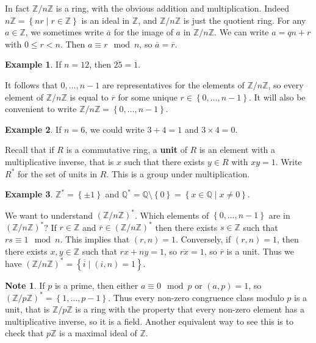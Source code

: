 \documentclass{article}
\newcommand{\Z}{\mathbb{Z}}
\newcommand{\Q}{\mathbb{Q}}
\newcommand{\rb}[1]{\left( #1 \right)}
\newcommand{\cb}[1]{\left\{ #1 \right\}}
\theoremstyle{definition}\newtheorem{definition}{Definition}
\theoremstyle{definition}\newtheorem*{remark}{Remark}
\theoremstyle{definition}\newtheorem*{example}{Example}
\theoremstyle{definition}\newtheorem*{note}{Note}
\begin{document}
In fact $ \Z / n\Z $ is a ring, with the obvious addition and multiplication. Indeed $ n\Z = \cb{nr \mid r \in \Z} $ is an ideal in $ \Z $, and $ \Z / n\Z $ is just the quotient ring. For any $ a \in \Z $, we sometimes write $ \overline{a} $ for the image of $ a $ in $ \Z / n\Z $. We can write $ a = qn + r $ with $ 0 \le r < n $. Then $ a \equiv r \mod n $, so $ \overline{a} = \overline{r} $.

\begin{example}
If $ n = 12 $, then $ \overline{25} = \overline{1} $.
\end{example}

It follows that $ 0, \dots, n - 1 $ are representatives for the elements of $ \Z / n\Z $, so every element of $ \Z / n\Z $ is equal to $ \overline{r} $ for some unique $ r \in \cb{0, \dots, n - 1} $. It will also be convenient to write $ \Z / n\Z = \cb{0, \dots, n - 1} $.

\begin{example}
If $ n = 6 $, we could write $ 3 + 4 = 1 $ and $ 3 \times 4 = 0 $.
\end{example}

Recall that if $ R $ is a commutative ring, a \textbf{unit} of $ R $ is an element with a multiplicative inverse, that is $ x $ such that there exists $ y \in R $ with $ xy = 1 $. Write $ R^* $ for the set of units in $ R $. This is a group under multiplication.

\begin{example}
$ \Z^* = \cb{\pm 1} $ and $ \Q^* = \Q \setminus \cb{0} = \cb{x \in \Q \mid x \ne 0} $.
\end{example}

We want to understand $ \rb{\Z / n\Z}^* $. Which elements of $ \cb{0, \dots, n - 1} $ are in $ \rb{\Z / n\Z}^* $? If $ r \in \Z $ and $ \overline{r} \in \rb{\Z / n\Z}^* $ then there exists $ s \in \Z $ such that $ rs \equiv 1 \mod n $. This implies that $ \rb{r, n} = 1 $. Conversely, if $ \rb{r, n} = 1 $, then there exists $ x, y \in \Z $ such that $ rx + ny = 1 $, so $ \overline{rx} = 1 $, so $ \overline{r} $ is a unit. Thus we have $ \rb{\Z / n\Z}^* = \cb{\overline{i} \mid \rb{i, n} = 1} $.

\begin{note}
If $ p $ is a prime, then either $ a \equiv 0 \mod p $ or $ \rb{a, p} = 1 $, so $ \rb{\Z / p\Z}^* = \cb{1, \dots, p - 1} $. Thus every non-zero congruence class modulo $ p $ is a unit, that is $ \Z / p\Z $ is a ring with the property that every non-zero element has a multiplicative inverse, so it is a field. Another equivalent way to see this is to check that $ p\Z $ is a maximal ideal of $ \Z $.
\end{note}
\end{document}
